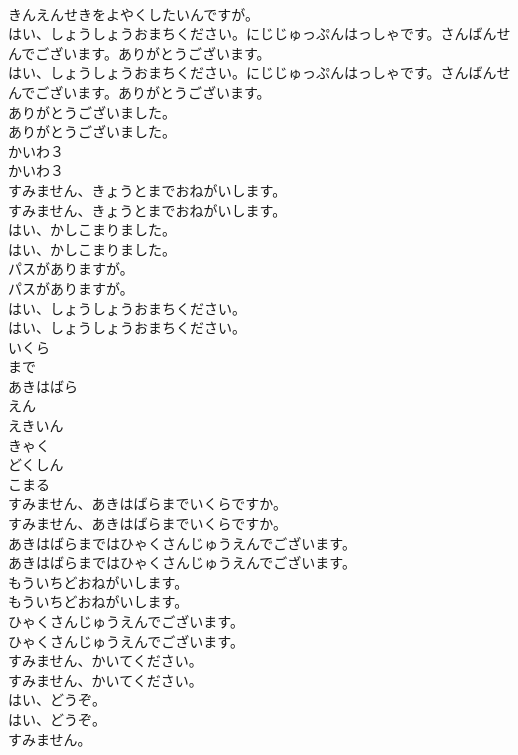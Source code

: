 \documentclass[8pt]{extreport}
\begin{document}
\begin{CJK}{UTF8}{min}
\\	きんえんせきをよやくしたいんですが。 
\\	はい、しょうしょうおまちください。にじじゅっぷんはっしゃです。さんばんせんでございます。ありがとうございます。	
\\	はい、しょうしょうおまちください。にじじゅっぷんはっしゃです。さんばんせんでございます。ありがとうございます。 
\\	ありがとうございました。	
\\	ありがとうございました。 
\\	かいわ３	
\\	かいわ３ 
\\	すみません、きょうとまでおねがいします。	
\\	すみません、きょうとまでおねがいします。 
\\	はい、かしこまりました。	
\\	はい、かしこまりました。 
\\	パスがありますが。	
\\	パスがありますが。 
\\	はい、しょうしょうおまちください。	
\\	はい、しょうしょうおまちください。 
\\	いくら
\\	まで
\\	あきはばら
\\	えん
\\	えきいん
\\	きゃく
\\	どくしん
\\	こまる
\\	すみません、あきはばらまでいくらですか。	
\\	すみません、あきはばらまでいくらですか。 
\\	あきはばらまではひゃくさんじゅうえんでございます。	
\\	あきはばらまではひゃくさんじゅうえんでございます。 
\\	もういちどおねがいします。	
\\	もういちどおねがいします。 
\\	ひゃくさんじゅうえんでございます。	
\\	ひゃくさんじゅうえんでございます。 
\\	すみません、かいてください。	
\\	すみません、かいてください。 
\\	はい、どうぞ。	
\\	はい、どうぞ。 
\\	すみません。	

\end{CJK}
\end{document}
